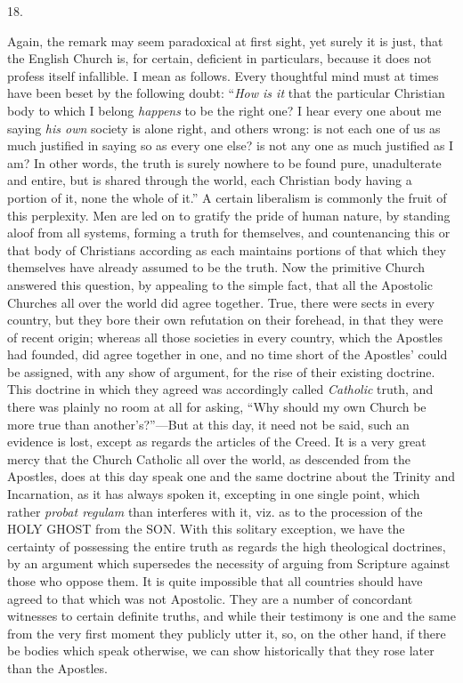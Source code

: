 18.

Again, the remark may seem paradoxical at first
sight, yet surely it is just, that the English Church is, for certain,
deficient in particulars, because it does not profess itself
infallible. I mean as follows. Every thoughtful mind must at times
have been beset by the following doubt: ``\emph{How is it} that the
particular Christian body to which I belong \emph{happens} to be the
right one? I hear every one about me saying \emph{his own} society is
alone right, and others wrong: is not each one of us as much justified
in saying so as every one else? is not any one as much justified as I
am? In other words, the truth is surely nowhere to be found pure,
unadulterate and entire, but is shared through the world, each
Christian body having a portion of it, none the whole of it.'' A
certain liberalism is commonly the fruit of this perplexity. Men are
led on to gratify the pride of human nature, by standing aloof from
all systems, forming a truth for themselves, and countenancing this or
that body of Christians according as each maintains portions of that
which they themselves have already assumed to be the truth. Now the
primitive Church answered this question, by appealing to the simple
fact, that all the Apostolic Churches all over the world did agree
together. True, there were sects in every country, but they bore their
own refutation on their forehead, in that they were of recent origin;
whereas all those societies in every country, which the Apostles had
founded, did agree together in one, and no time short of the Apostles'
could be assigned, with any show of argument, for the rise of their
existing doctrine. This doctrine in which they agreed was accordingly
called \emph{Catholic} truth, and there was plainly no room at all for
asking, ``Why should my own Church be more true than another's?''—But
at this day, it need not be said, such an evidence is lost, except as
regards the articles of the Creed. It is a very great mercy that the
Church Catholic all over the world, as descended from the Apostles,
does at this day speak one and the same doctrine about the Trinity and
Incarnation, as it has always spoken it, excepting in one single
point, which rather \emph{probat regulam} than interferes with it,
viz. as to the procession of the HOLY
GHOST from the SON.
With this solitary exception, we have the certainty of possessing the
entire truth as regards the high theological doctrines, by an argument
which supersedes the necessity of arguing from Scripture against those
who oppose them. It is quite impossible that all countries should have
agreed to that which was not Apostolic. They are a number of
concordant witnesses to certain definite truths, and while their
testimony is one and the same from the very first moment they publicly utter it, so, on the other hand, if there be bodies which
speak otherwise, we can show historically that they rose later than
the Apostles.

